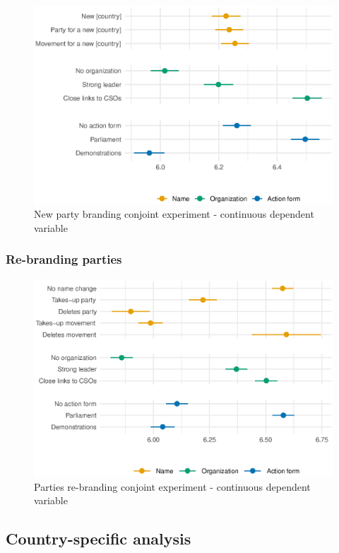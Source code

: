 \documentclass[12pt]{article}
\begin{document}
\begin{figure}[H]
\includegraphics[width=\textwidth]{./Figures/CJ1_main_cont.eps}
\caption{New party branding conjoint experiment - continuous dependent variable}
\end{figure}

\subsubsection{Re-branding parties}

\begin{figure}[H]
\includegraphics[width=\textwidth]{./Figures/CJ2_main_cont.eps}
\caption{Parties re-branding conjoint experiment - continuous dependent variable}
\end{figure}

\subsection{Country-specific analysis}
\end{document}
